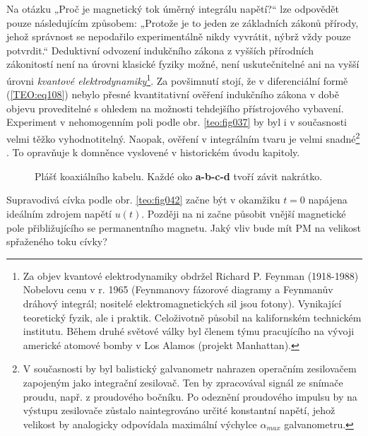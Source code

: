     Na otázku „Proč je magnetický tok úměrný integrálu napětí?“ lze odpovědět pouze následujícím
    způsobem: „Protože je to jeden ze základních zákonů přírody, jehož správnost se nepodařilo
    experimentálně nikdy vyvrátit, nýbrž vždy pouze potvrdit.“ Deduktivní odvození indukčního zákona
    z vyšších přírodních zákonitostí není na úrovni klasické fyziky možné, není uskutečnitelné ani
    na vyšší úrovni \emph{kvantové elektrodynamiky}\footnote{Za objev kvantové elektrodynamiky
    obdržel Richard P. Feynman (1918-1988) Nobelovu cenu v r. 1965 (Feynmanovy fázorové diagramy a
    Feynmanův dráhový integrál; nositelé elektromagnetických sil jsou fotony). Vynikající teoretický
    fyzik, ale i praktik. Celoživotně působil na kalifornském technickém institutu. Během druhé
    světové války byl členem týmu pracujícího na vývoji americké atomové bomby v Los Alamos (projekt
    Manhattan).}. Za povšimnutí stojí, že v diferenciální formě (\ref{TEO:eq108}) nebylo
    přesné kvantitativní ověření indukčního zákona v době objevu proveditelné s ohledem na možnosti
    tehdejšího přístrojového vybavení. Experiment v nehomogenním poli podle obr. \ref{teo:fig037} by
    byl i v současnosti velmi těžko vyhodnotitelný. Naopak, ověření v integrálním tvaru je velmi
    snadné\footnote{V současnosti by byl balistický galvanometr nahrazen operačním zesilovačem
    zapojeným jako integrační zesilovač. Ten by zpracovával signál ze snímače proudu, např. z
    proudového bočníku. Po odeznění proudového impulsu by na výstupu zesilovače zůstalo
    naintegrováno určité konstantní napětí, jehož velikost by analogicky odpovídala maximální
    výchylce \(\alpha_{max}\) galvanometru.} . To opravňuje k domněnce vyslovené v historickém úvodu
    kapitoly.

    \begin{figure}[ht!]
      \centering  
      \caption{Plášť koaxiálního kabelu. Každé oko \textbf{a-b-c-d} tvoří závit nakrátko.} 
      \label{teo:fig041}
    \end{figure}
      
    Supravodivá cívka podle obr. \ref{teo:fig042} začne být v okamžiku \(t = 0\)
    napájena ideálním zdrojem napětí \(u(t)\). Později na ni začne působit vnější magnetické pole
    přibližujícího se permanentního magnetu. Jaký vliv bude mít PM na velikost spřaženého toku
    cívky?
    
